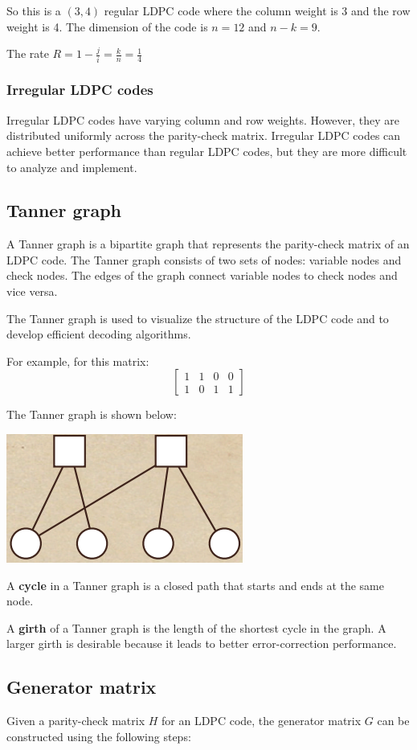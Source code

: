\documentclass[letterpaper,12pt,oneside]{article}
\begin{document}
So this is a $(3,4)$ regular LDPC code where the column weight is 3 and the row weight is 4. The dimension of the code is $n=12$ and $n-k=9$. 

The rate $R=1-\frac{j}{i}=\frac{k}{n}=\frac{1}{4}$
\subsubsection{Irregular LDPC codes}
Irregular LDPC codes have varying column and row weights. However, they are distributed uniformly across the parity-check matrix. Irregular LDPC codes can achieve better performance than regular LDPC codes, but they are more difficult to analyze and implement.
\subsection{Tanner graph}
A Tanner graph is a bipartite graph that represents the parity-check matrix of an LDPC code. The Tanner graph consists of two sets of nodes: variable nodes and check nodes. The edges of the graph connect variable nodes to check nodes and vice versa. 

The Tanner graph is used to visualize the structure of the LDPC code and to develop efficient decoding algorithms.

For example, for this matrix: \[
    \begin{bmatrix}
        1 & 1 & 0 & 0\\
        1 & 0 & 1 & 1
    \end{bmatrix}
\]

The Tanner graph is shown below:

\includegraphics*{./Images/Tanner Graph Example.png}

A \textbf{cycle} in a Tanner graph is a closed path that starts and ends at the same node. 

A \textbf{girth} of a Tanner graph is the length of the shortest cycle in the graph. A larger girth is desirable because it leads to better error-correction performance.
\subsection{Generator matrix}
Given a parity-check matrix $H$ for an LDPC code, the generator matrix $G$ can be constructed using the following steps:
\end{document}
